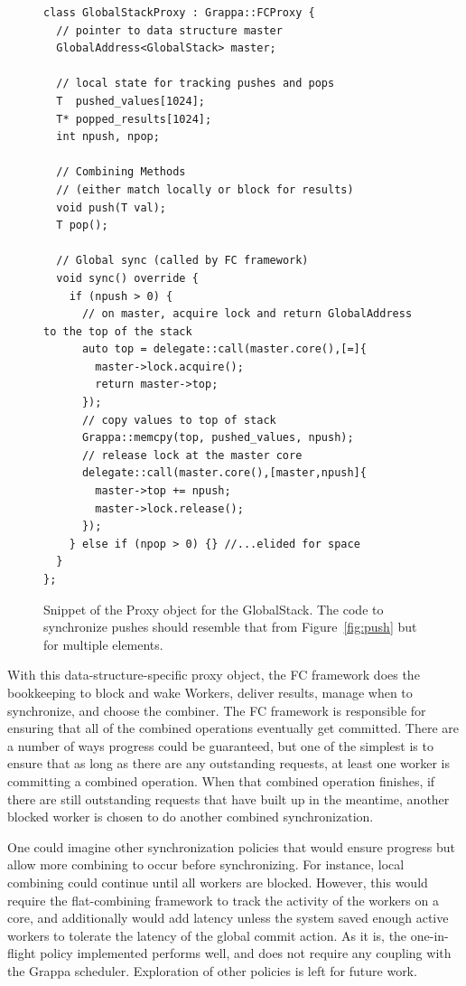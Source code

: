 \begin{figure}[t]
\centering
\begin{lstlisting}[style=grappa]
class GlobalStackProxy : Grappa::FCProxy {
  // pointer to data structure master
  GlobalAddress<GlobalStack> master;
  
  // local state for tracking pushes and pops
  T  pushed_values[1024];
  T* popped_results[1024];
  int npush, npop;

  // Combining Methods 
  // (either match locally or block for results)
  void push(T val);
  T pop();
  
  // Global sync (called by FC framework)
  void sync() override {
    if (npush > 0) {
      // on master, acquire lock and return GlobalAddress to the top of the stack
      auto top = delegate::call(master.core(),[=]{
        master->lock.acquire();
        return master->top;
      });
      // copy values to top of stack
      Grappa::memcpy(top, pushed_values, npush);
      // release lock at the master core
      delegate::call(master.core(),[master,npush]{
        master->top += npush;
        master->lock.release();
      });
    } else if (npop > 0) {} //...elided for space
  }
};
\end{lstlisting}
\caption{Snippet of the Proxy object for the GlobalStack. The code to synchronize pushes should resemble that from Figure~\ref{fig:push} but for multiple elements.}
\label{fig:proxy}
\end{figure}

With this data-structure-specific proxy object, the FC framework does the bookkeeping to block and wake Workers, deliver results, manage when to synchronize, and choose the combiner.
The FC framework is responsible for ensuring that all of the combined operations eventually get committed. There are a number of ways progress could be guaranteed, but one of the simplest is to ensure that as long as there are any outstanding requests, at least one worker is committing a combined operation.
When that combined operation finishes, if there are still outstanding requests that have built up in the meantime, another blocked worker is chosen to do another combined synchronization.

One could imagine other synchronization policies that would ensure progress but allow more combining to occur before synchronizing. For instance, local combining could continue until all workers are blocked. However, this would require the flat-combining framework to track the activity of the workers on a core, and additionally would add latency unless the system saved enough active workers to tolerate the latency of the global commit action. As it is, the one-in-flight policy implemented performs well, and does not require any coupling with the Grappa scheduler. Exploration of other policies is left for future work.

